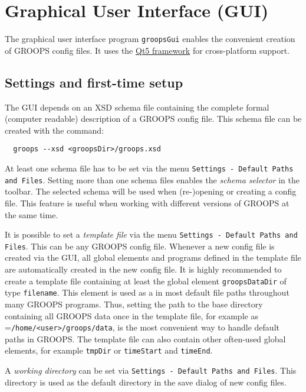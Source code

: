 \section{Graphical User Interface (GUI)}\label{general.gui}

The graphical user interface program \verb|groopsGui| enables the convenient creation of GROOPS config files.
It uses the \href{https://qt.io}{Qt5 framework} for cross-platform support.


\subsection{Settings and first-time setup}

The GUI depends on an XSD schema file containing the complete formal (computer readable) description of a GROOPS config file.
This schema file can be created with the command:
\begin{verbatim}
  groops --xsd <groopsDir>/groops.xsd
\end{verbatim}
At least one schema file has to be set via
the menu \verb|Settings - Default Paths and Files|. Setting more than one schema files enables the \emph{schema selector} in the toolbar.
The selected schema will be used when (re-)opening or creating a config file.
This feature is useful when working with different versions of GROOPS at the same time.

It is possible to set a \emph{template file} via the menu \verb|Settings - Default Paths and Files|. This can be any GROOPS config file.
Whenever a new config file is created via the GUI, all global elements and programs defined in the template file are automatically created in the new config file.
It is highly recommended to create a template file containing at least the global element \verb|groopsDataDir| of type \verb|filename|.
This element is used as a  in most default file paths throughout many GROOPS programs.
Thus, setting the path to the base directory containing all GROOPS data once in the template file, for example as
=\verb|/home/<user>/groops/data|, is the most convenient way to handle default paths in GROOPS.
The template file can also contain other often-used global elements, for example \verb|tmpDir| or  \verb|timeStart| and  \verb|timeEnd|.

A \emph{working directory} can be set via \verb|Settings - Default Paths and Files|.
This directory is used as the default directory in the save dialog of new config files.

